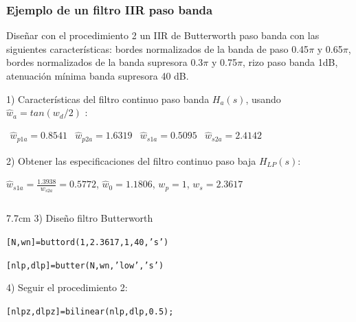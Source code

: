 \begin{frame}
\frametitle{Ejemplo de un filtro  IIR paso banda}
\footnotesize

\footnotesize
\color{olivegreen} Diseñar con el procedimiento 2 un IIR de Butterworth paso banda con las siguientes características: bordes normalizados de la banda de paso 0.45$\pi$ y 0.65$\pi$, bordes normalizados de la banda supresora 0.3$\pi$ y 0.75$\pi$, rizo paso banda 1dB, atenuación mínima banda supresora 40 dB.
\color{gray}
\vspace{0.1cm}

1)  Características del filtro continuo paso banda $H_a(s)$, usando $\hat w_{a}=tan(w_{d}/2)$  :

$\begin{array}{llll}\hat w_{p1a}=0.8541 &\hat w_{p2a}=1.6319  & \hat w_{s1a}=0.5095 & \hat w_{s2a}=2.4142
\end{array}$

\vspace{0.1cm}

2) Obtener las especificaciones del filtro continuo paso baja $H_{LP}(s)$:

\vspace{0.1cm}

\hspace{0.25cm}$\hat w_{s1a}=\frac{1.3938}{w_{s2a}}=0.5772$, $\hat w_0=1.1806$, $w_p=1$, $w_{s}=2.3617$


\vspace{0.1cm}

\begin{columns}[T]
 \hspace{0.2cm}\begin{column}{7.7cm}
3) Diseño filtro Butterworth

\vspace{0.1cm}

\hspace{0.25cm}\texttt{[N,wn]=buttord(1,2.3617,1,40,'s')}

\hspace{0.25cm}\texttt{[nlp,dlp]=butter(N,wn,'low','s')}

\vspace{0.1cm}

 4) Seguir el procedimiento 2:

 \vspace{0.1cm}

  \hspace{0.25cm}\texttt{[nlpz,dlpz]=bilinear(nlp,dlp,0.5);}

\end{column}
\end{columns}
\end{frame}
